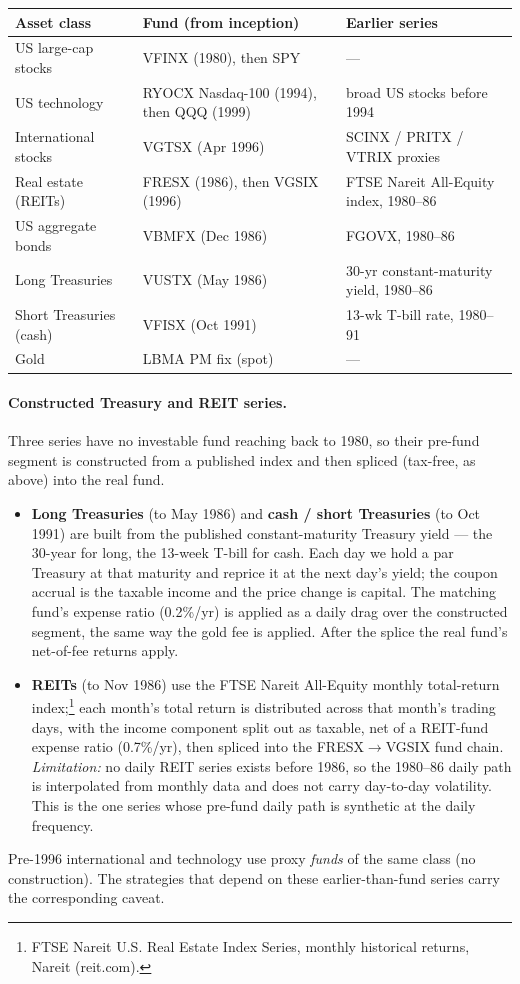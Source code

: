 \documentclass[11pt]{article}
\begin{document}
{\small
\begin{center}
\begin{tabular}{@{}lll@{}}
\toprule
Asset class & Fund (from inception) & Earlier series \\
\midrule
US large-cap stocks & VFINX (1980), then SPY & --- \\
US technology & RYOCX Nasdaq-100 (1994), then QQQ (1999) & broad US stocks before 1994 \\
International stocks & VGTSX (Apr 1996) & SCINX / PRITX / VTRIX proxies \\
Real estate (REITs) & FRESX (1986), then VGSIX (1996) & FTSE Nareit All-Equity index, 1980--86 \\
US aggregate bonds & VBMFX (Dec 1986) & FGOVX, 1980--86 \\
Long Treasuries & VUSTX (May 1986) & 30-yr constant-maturity yield, 1980--86 \\
Short Treasuries (cash) & VFISX (Oct 1991) & 13-wk T-bill rate, 1980--91 \\
Gold & LBMA PM fix (spot) & --- \\
\bottomrule
\end{tabular}
\end{center}
}

\paragraph{Constructed Treasury and REIT series.} Three series have no investable fund reaching back to
1980, so their pre-fund segment is constructed from a published index and then spliced (tax-free, as
above) into the real fund.
\begin{itemize}
\item \textbf{Long Treasuries} (to May 1986) and \textbf{cash / short Treasuries} (to Oct 1991) are
built from the published constant-maturity Treasury yield --- the 30-year for long, the 13-week
T-bill for cash. Each day we hold a par Treasury at that maturity and reprice it at the next day's
yield; the coupon accrual is the taxable income and the price change is capital. The matching fund's
expense ratio (0.2\%/yr) is applied as a daily drag over the constructed segment, the same way the
gold fee is applied. After the splice the real fund's net-of-fee returns apply.
\item \textbf{REITs} (to Nov 1986) use the FTSE Nareit All-Equity monthly total-return
index;\footnote{FTSE Nareit U.S. Real Estate Index Series, monthly historical returns, Nareit
(reit.com).} each month's total return is distributed across that month's trading days, with the
income component split out as taxable, net of a REIT-fund expense ratio (0.7\%/yr), then spliced into
the FRESX$\to$VGSIX fund chain. \emph{Limitation:} no daily REIT series exists before 1986, so the
1980--86 daily path is interpolated from monthly data and does not carry day-to-day volatility. This
is the one series whose pre-fund daily path is synthetic at the daily frequency.
\end{itemize}
Pre-1996 international and technology use proxy \emph{funds} of the same class (no construction). The
strategies that depend on these earlier-than-fund series carry the corresponding caveat.
\end{document}
